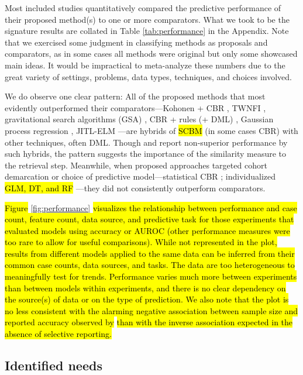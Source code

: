 \documentclass[sn-mathphys,Numbered,pdflatex]{sn-jnl}
\theoremstyle{remark}
\theoremstyle{definition}
\begin{document}
Most included studies quantitatively compared the predictive performance
of their proposed method(s) to one or more comparators. What we took to
be the signature results are collated in Table \ref{tab:performance} in
the Appendix. Note that we exercised some judgment in classifying
methods as proposals and comparators, as in some cases all methods were
original but only some showcased main ideas. It would be impractical to
meta-analyze these numbers due to the great variety of settings,
problems, data types, techniques, and choices involved.

We do observe one clear pattern: All of the proposed methods that most
evidently outperformed their comparators---Kohonen + CBR
\citep{Wyns2004}, TWNFI \citep{Song2006, Kasabov2010}, gravitational
search algorithms (GSA) \citep{Liang2015}, CBR + rules (+ DML)
\citep{Nicolas2014}, Gaussian process regression \citep{Zhang2018},
JITL-ELM \citep{Ma2020}---are hybrids of \hl{SCBM} (in some cases CBR)
with other techniques, often DML. Though \citet{CampilloGimenez2013} and
\citet{Ng2015} report non-superior performance by such hybrids, the
pattern suggests the importance of the similarity measure to the
retrieval step. Meanwhile, when proposed approaches targeted cohort
demarcation or choice of predictive model---statistical CBR
\citep{Park2006}; individualized \hl{GLM, DT, and RF}
\citep{Lee2015, Lee2017}---they did not consistently outperform
comparators.

\hl{Figure }\ref{fig:performance}\hl{ visualizes the relationship between performance and case count, feature count, data source, and predictive task for those experiments that evaluated models using accuracy or AUROC (other performance measures were too rare to allow for useful comparisons).
While not represented in the plot, results from different models applied to the same data can be inferred from their common case counts, data sources, and tasks.
The data are too heterogeneous to meaningfully test for trends. Performance varies much more between experiments than between models within experiments, and there is no clear dependency on the source(s) of data or on the type of prediction.
We also note that the plot is no less consistent with the alarming negative association between sample size and reported accuracy observed by }\citet{Berisha2021}\hl{ than with the inverse association expected in the absence of selective reporting.}

\subsection{Identified needs}\label{identified-needs}
\end{document}
